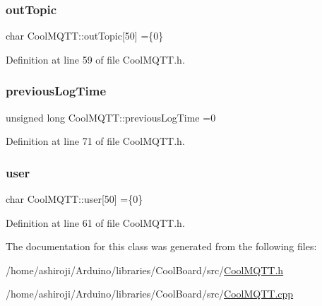 \subsubsection{\texorpdfstring{out\+Topic}{outTopic}}
{\footnotesize\ttfamily char Cool\+M\+Q\+T\+T\+::out\+Topic\mbox{[}50\mbox{]} =\{\textquotesingle{}0\textquotesingle{}\}\hspace{0.3cm}{\ttfamily [private]}}



Definition at line 59 of file Cool\+M\+Q\+T\+T.\+h.

\mbox{\label{class_cool_m_q_t_t_a3db37ef9ed3b05b2a8d44edba0e7d3cc}} 
\subsubsection{\texorpdfstring{previous\+Log\+Time}{previousLogTime}}
{\footnotesize\ttfamily unsigned long Cool\+M\+Q\+T\+T\+::previous\+Log\+Time =0\hspace{0.3cm}{\ttfamily [private]}}



Definition at line 71 of file Cool\+M\+Q\+T\+T.\+h.

\mbox{\label{class_cool_m_q_t_t_a8cd47e45d457f908d4b4390b35aaee83}} 
\subsubsection{\texorpdfstring{user}{user}}
{\footnotesize\ttfamily char Cool\+M\+Q\+T\+T\+::user\mbox{[}50\mbox{]} =\{\textquotesingle{}0\textquotesingle{}\}\hspace{0.3cm}{\ttfamily [private]}}



Definition at line 61 of file Cool\+M\+Q\+T\+T.\+h.



The documentation for this class was generated from the following files\+:\begin{DoxyCompactItemize}
\item 
/home/ashiroji/\+Arduino/libraries/\+Cool\+Board/src/\hyperlink{_cool_m_q_t_t_8h}{Cool\+M\+Q\+T\+T.\+h}\item 
/home/ashiroji/\+Arduino/libraries/\+Cool\+Board/src/\hyperlink{_cool_m_q_t_t_8cpp}{Cool\+M\+Q\+T\+T.\+cpp}\end{DoxyCompactItemize}
